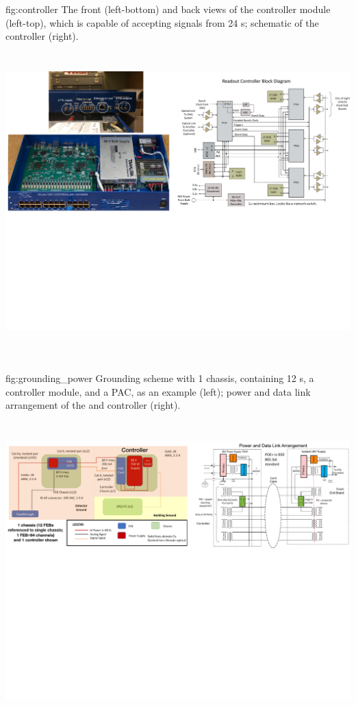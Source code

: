 \begin{dunefigure}
 {fig:controller}
 {The front (left-bottom) and back views of the controller module (left-top), which is capable of accepting signals from 24 s; schematic of the controller (right).}
\includegraphics[height=4.8in]{graphics/pds-controller.pdf} 
\vspace{-5.5cm}
\end{dunefigure}

\begin{dunefigure}
 {fig:grounding_power}
 {Grounding scheme with 1 chassis, containing 12 s, a controller module, and a  PAC, as an example (left); power and data link arrangement of the  and controller (right).}
\includegraphics[height=4.8in]{graphics/pds-grounding-power.pdf} 
\vspace{-7.1cm}
\end{dunefigure}


